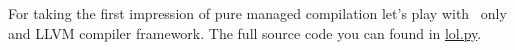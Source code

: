\clearpage{}\label{llvmpy}

For taking the first impression of pure managed compilation let's play with
\py\ only and LLVM compiler framework. The full source code you can found in
\href{https://github.com/ponyatov/o/blob/master/lol.py}{lol.py}.
